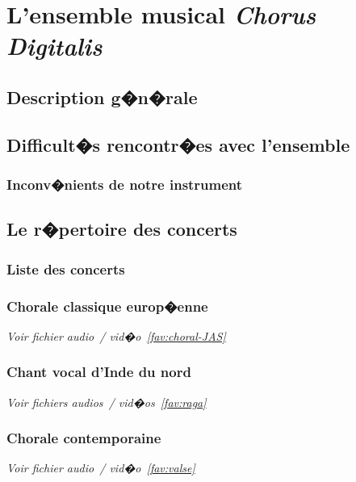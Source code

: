 \chapter{L'ensemble musical \textit{Chorus Digitalis}}
\label{Sec:ChorusDigitalis}

\section{Description g�n�rale}
\lipsum[1-2]

\section{Difficult�s rencontr�es avec l'ensemble}
\lipsum[1-2]

\subsection*{Inconv�nients de notre instrument}
\lipsum[1-2]

\section{Le r�pertoire des concerts}
\lipsum[1-2]

\subsection{Liste des concerts}
\lipsum[1-2]

\subsection{Chorale classique europ�enne}
\label{sec:chorus-choral}
\noindent \textit{Voir fichier audio~/ vid�o~\ref{fav:choral-JAS}}\\
\lipsum[1-2]

\subsection{Chant vocal d'Inde du nord}
\label{sec:chorus-raga}
\noindent \textit{Voir fichiers audios~/ vid�os~\ref{fav:raga}}\\
\lipsum[1-2]

\subsection{Chorale contemporaine}
\label{sec:chorus-contempo}
\noindent \textit{Voir fichier audio~/ vid�o~\ref{fav:valse}}\\
\lipsum[1-2]


